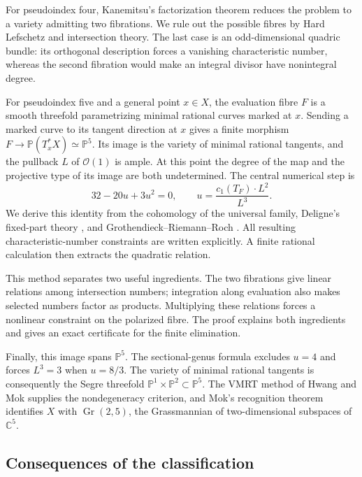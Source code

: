 For pseudoindex four, Kanemitsu's factorization theorem reduces the
problem to a variety admitting two fibrations. We rule out the possible
fibres by Hard Lefschetz and intersection theory. The last case is an
odd-dimensional quadric bundle: its orthogonal description forces a
vanishing characteristic number, whereas the second fibration would
make an integral divisor have nonintegral degree.

For pseudoindex five and a general point $x\in X$, the evaluation fibre
$F$ is a smooth threefold parametrizing minimal rational curves marked at
$x$. Sending a marked
curve to its tangent direction at $x$ gives a finite morphism
$F\to\mathbb P(T_x^*X)\simeq\mathbb P^5$. Its image is the variety of
minimal rational tangents, and the pullback $L$ of $\mathcal O(1)$ is
ample. At this point the degree of the map and the projective type of
its image are both undetermined. The central numerical step is
\[
 32-20u+3u^2=0,
 \qquad u=\frac{c_1(T_F)\cdot L^2}{L^3}.
\]
We derive this identity from the cohomology of the universal family,
Deligne's fixed-part theory \cite{Deligne1971}, and
Grothendieck--Riemann--Roch \cite{BorelSerre1958}. All resulting characteristic-number
constraints are written explicitly. A finite rational calculation then
extracts the quadratic relation.

This method separates two useful ingredients. The two fibrations give
linear relations among intersection numbers; integration along evaluation
also makes selected numbers factor as products. Multiplying these
relations forces a nonlinear constraint on the polarized fibre.
The proof explains both ingredients and gives an exact certificate for
the finite elimination.

Finally, this image spans $\mathbb P^5$. The sectional-genus
formula excludes $u=4$ and forces $L^3=3$ when $u=8/3$.
The variety of minimal rational tangents is consequently the Segre
threefold $\mathbb P^1\times\mathbb P^2\subset\mathbb P^5$.
The VMRT method of Hwang and Mok
\cite[Propositions~1.2.1--1.2.2]{HwangMok1999} supplies the
nondegeneracy criterion, and Mok's recognition theorem
\cite{Mok2008Recognition} identifies $X$ with
$\operatorname{Gr}(2,5)$, the Grassmannian of two-dimensional subspaces
of $\mathbb C^5$.

\subsection{Consequences of the classification}

